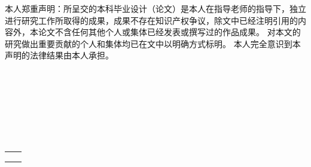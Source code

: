
\begin{declarationzh}
	
本人郑重声明：所呈交的本科毕业设计（论文）是本人在指导老师的指导下，独立进行研究工作所取得的成果，成果不存在知识产权争议，除文中已经注明引用的内容外，本论文不含任何其他个人或集体已经发表或撰写过的作品成果。
对本文的研究做出重要贡献的个人和集体均已在文中以明确方式标明。
本人完全意识到本声明的法律结果由本人承担。
\\
\\
\\
\\
\\
\\
\\
\\
	
	\vspace{30pt}
	\begin{tabular}{ll}
		\makebox[4em][s]{作者签名：李明浩} & \makebox[100pt][c]{  } \\
		\\
		\makebox[2em][s]{日期:}	 &
		\makebox[100pt][c]{\qquad2026年\quad5月\quad18日} \\
	\end{tabular}

	
	
\end{declarationzh}
